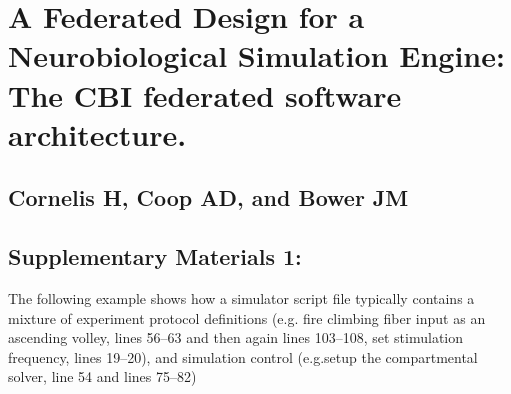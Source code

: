 \documentclass[10pt]{article}
\begin{document}
\section*{A Federated Design for a Neurobiological Simulation Engine: 
The CBI federated software architecture.}
\subsection*{Cornelis H, Coop AD, and Bower JM}
\subsection*{Supplementary Materials 1:} 

The following example shows how a simulator script file typically
contains a mixture of experiment protocol definitions (e.g. fire
climbing fiber input as an ascending volley, lines 56--63 and then
again lines 103--108, set stimulation frequency, lines 19--20), and
simulation control (e.g.setup the compartmental solver, line 54 and
lines 75--82)
\end{document}

